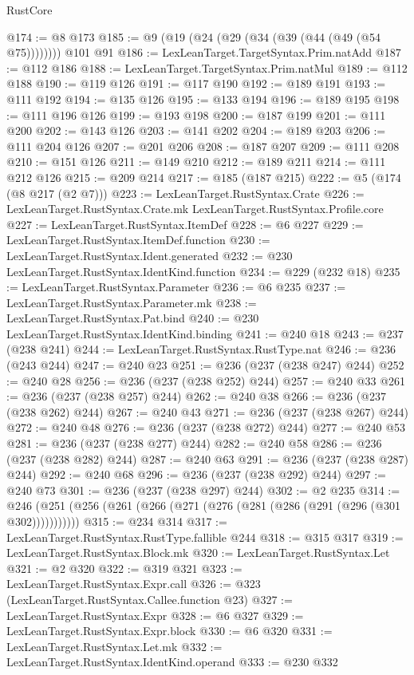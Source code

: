 \begin{lexlean}{RustCore}
\begin{coremodule}
@174 := @8 @173
@185 := @9 (@19 (@24 (@29 (@34 (@39 (@44 (@49 (@54 @75)))))))) @101 @91
@186 := LexLeanTarget.TargetSyntax.Prim.natAdd
@187 := @112 @186
@188 := LexLeanTarget.TargetSyntax.Prim.natMul
@189 := @112 @188
@190 := @119 @126
@191 := @117 @190
@192 := @189 @191
@193 := @111 @192
@194 := @135 @126
@195 := @133 @194
@196 := @189 @195
@198 := @111 @196 @126
@199 := @193 @198
@200 := @187 @199
@201 := @111 @200
@202 := @143 @126
@203 := @141 @202
@204 := @189 @203
@206 := @111 @204 @126
@207 := @201 @206
@208 := @187 @207
@209 := @111 @208
@210 := @151 @126
@211 := @149 @210
@212 := @189 @211
@214 := @111 @212 @126
@215 := @209 @214
@217 := @185 (@187 @215)
@222 := @5 (@174 (@8 @217 (@2 @7)))
@223 := LexLeanTarget.RustSyntax.Crate
@226 := LexLeanTarget.RustSyntax.Crate.mk LexLeanTarget.RustSyntax.Profile.core
@227 := LexLeanTarget.RustSyntax.ItemDef
@228 := @6 @227
@229 := LexLeanTarget.RustSyntax.ItemDef.function
@230 := LexLeanTarget.RustSyntax.Ident.generated
@232 := @230 LexLeanTarget.RustSyntax.IdentKind.function
@234 := @229 (@232 @18)
@235 := LexLeanTarget.RustSyntax.Parameter
@236 := @6 @235
@237 := LexLeanTarget.RustSyntax.Parameter.mk
@238 := LexLeanTarget.RustSyntax.Pat.bind
@240 := @230 LexLeanTarget.RustSyntax.IdentKind.binding
@241 := @240 @18
@243 := @237 (@238 @241)
@244 := LexLeanTarget.RustSyntax.RustType.nat
@246 := @236 (@243 @244)
@247 := @240 @23
@251 := @236 (@237 (@238 @247) @244)
@252 := @240 @28
@256 := @236 (@237 (@238 @252) @244)
@257 := @240 @33
@261 := @236 (@237 (@238 @257) @244)
@262 := @240 @38
@266 := @236 (@237 (@238 @262) @244)
@267 := @240 @43
@271 := @236 (@237 (@238 @267) @244)
@272 := @240 @48
@276 := @236 (@237 (@238 @272) @244)
@277 := @240 @53
@281 := @236 (@237 (@238 @277) @244)
@282 := @240 @58
@286 := @236 (@237 (@238 @282) @244)
@287 := @240 @63
@291 := @236 (@237 (@238 @287) @244)
@292 := @240 @68
@296 := @236 (@237 (@238 @292) @244)
@297 := @240 @73
@301 := @236 (@237 (@238 @297) @244)
@302 := @2 @235
@314 := @246 (@251 (@256 (@261 (@266 (@271 (@276 (@281 (@286 (@291 (@296 (@301 @302)))))))))))
@315 := @234 @314
@317 := LexLeanTarget.RustSyntax.RustType.fallible @244
@318 := @315 @317
@319 := LexLeanTarget.RustSyntax.Block.mk
@320 := LexLeanTarget.RustSyntax.Let
@321 := @2 @320
@322 := @319 @321
@323 := LexLeanTarget.RustSyntax.Expr.call
@326 := @323 (LexLeanTarget.RustSyntax.Callee.function @23)
@327 := LexLeanTarget.RustSyntax.Expr
@328 := @6 @327
@329 := LexLeanTarget.RustSyntax.Expr.block
@330 := @6 @320
@331 := LexLeanTarget.RustSyntax.Let.mk
@332 := LexLeanTarget.RustSyntax.IdentKind.operand
@333 := @230 @332

\end{coremodule}
\end{lexlean}
